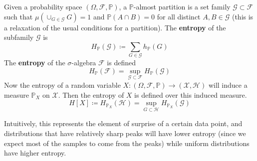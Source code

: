 \documentclass{article}
\begin{document}
    \begin{definition}[Entropy]
      Given a probability space $(\Omega, \mathcal{F}, \mathbb{P})$, a $\mathbb{P}$-almost partition is a set family $\mathcal{G} \subset \mathcal{F}$ such that $\mu(\cup_{G \in \mathcal{G}} G) = 1$ and $\mathbb{P}(A \cap B) = 0$ for all distinct $A, B \in \mathcal{G}$ (this is a relaxation of the usual conditions for a partition). The \textbf{entropy} of the subfamily $\mathcal{G}$ is 
      \begin{equation}
        H_\mathbb{P} (\mathcal{G}) \coloneqq \sum_{G \in \mathcal{G}} h_\mathbb{P}(G)
      \end{equation}
      The \textbf{entropy} of the $\sigma$-algebra $\mathcal{F}$ is defined 
      \begin{equation}
        H_\mathbb{P} (\mathcal{F}) = \sup_{\mathcal{G} \subset \mathcal{F}} H_\mathbb{P} (\mathcal{G})
      \end{equation}
      Now the entropy of a random variable $X: (\Omega, \mathcal{F}, \mathbb{P}) \rightarrow (\mathcal{X}, \mathcal{H})$ will induce a measure $\mathbb{P}_X$ on $\mathcal{X}$. Then the entropy of $X$ is defined over this induced measure. 
      \begin{equation}
        H[X] \coloneqq H_{\mathbb{P}_{X}} (\mathcal{H}) = \sup_{G \subset \mathcal{H}} H_{\mathbb{P}_X} (\mathcal{G})
      \end{equation}
    \end{definition}

    Intuitively, this represents the element of surprise of a certain data point, and distributions that have relatively sharp peaks will have lower entropy (since we expect most of the samples to come from the peaks) while uniform distributions have higher entropy. 



\end{document}
